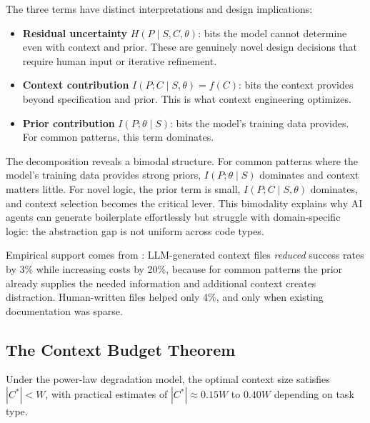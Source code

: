 The three terms have distinct interpretations and design implications:

\begin{itemize}[nosep]
    \item \textbf{Residual uncertainty} $H(P \mid S, C, \theta)$: bits the model cannot determine even with context and prior. These are genuinely novel design decisions that require human input or iterative refinement.
    \item \textbf{Context contribution} $I(P; C \mid S, \theta) = f(C)$: bits the context provides beyond specification and prior. This is what context engineering optimizes.
    \item \textbf{Prior contribution} $I(P; \theta \mid S)$: bits the model's training data provides. For common patterns, this term dominates.
\end{itemize}

The decomposition reveals a bimodal structure. For common patterns where the model's training data provides strong priors, $I(P; \theta \mid S)$ dominates and context matters little. For novel logic, the prior term is small, $I(P; C \mid S, \theta)$ dominates, and context selection becomes the critical lever. This bimodality explains why AI agents can generate boilerplate effortlessly but struggle with domain-specific logic: the abstraction gap is not uniform across code types.

Empirical support comes from \citet{gloaguen2026agents}: LLM-generated context files \emph{reduced} success rates by 3\% while increasing costs by 20\%, because for common patterns the prior already supplies the needed information and additional context creates distraction. Human-written files helped only 4\%, and only when existing documentation was sparse.

\subsection{The Context Budget Theorem}

\begin{theorem}
\label{thm:context-budget}
Under the power-law degradation model, the optimal context size satisfies $|C^*| < W$, with practical estimates of $|C^*| \approx 0.15W$ to $0.40W$ depending on task type.
\end{theorem}

